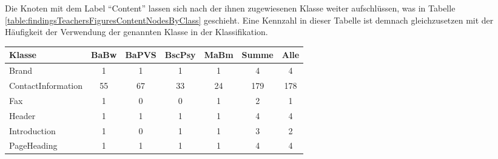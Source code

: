     Die Knoten mit dem Label "`Content"' lassen sich nach der ihnen zugewiesenen Klasse
    weiter aufschlüssen, was in Tabelle \ref{table:findingsTeachersFiguresContentNodesByClass} geschieht.
    Eine Kennzahl in dieser Tabelle ist demnach gleichzusetzen mit der Häufigkeit der Verwendung
    der genannten Klasse in der Klassifikation.

    \begin{table}[htb]
        \centering
        \begin{tabular}{|l|c|c|c|c|c|c|}
        \hline
            \textbf{Klasse}  & \multicolumn{1}{l|}{\textbf{BaBw}} & \multicolumn{1}{l|}{\textbf{BaPVS}} & \multicolumn{1}{l|}{\textbf{BscPsy}} & \multicolumn{1}{l|}{\textbf{MaBm}} & \multicolumn{1}{l|}{\textbf{Summe}} & \multicolumn{1}{l|}{\textbf{Alle}} \\ \hline
            Brand              & 1                                  & 1                                   & 1                                    & 1                                  & 4                                   & 4                                  \\ \hline
            ContactInformation & 55                                 & 67                                  & 33                                   & 24                                 & 179                                 & 178                                \\ \hline
            Fax                & 1                                  & 0                                   & 0                                    & 1                                  & 2                                   & 1                                  \\ \hline
            Header             & 1                                  & 1                                   & 1                                    & 1                                  & 4                                   & 4                                  \\ \hline
            Introduction       & 1                                  & 0                                   & 1                                    & 1                                  & 3                                   & 2                                  \\ \hline
            PageHeading        & 1                                  & 1                                   & 1                                    & 1                                  & 4                                   & 4                                  \\ \hline

\end{tabular}
\end{table}
